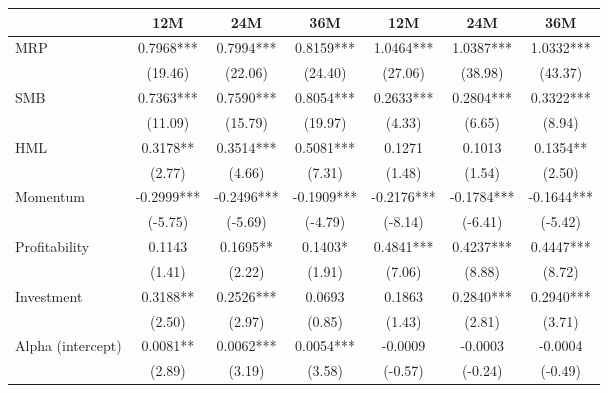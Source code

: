 \documentclass[xcolor=dvipsnames, english, 8pt]{beamer}
\begin{document}
\begin{frame}
\begin{footnotesize}
\begin{center}
\begin{tabular}{lcccccc}
              &\multicolumn{1}{c}{12M}&\multicolumn{1}{c}{24M}&\multicolumn{1}{c}{36M}&\multicolumn{1}{c}{12M}&\multicolumn{1}{c}{24M}&\multicolumn{1}{c}{36M}\\
\midrule
MRP &  0.7968***&  0.7994***&      0.8159***& 1.0464***&      1.0387***& 1.0332***\\
                    &     (19.46)         &     (22.06)         &     (24.40)         &     (27.06)         &     (38.98)         &     (43.37)         \\
\addlinespace
SMB  &  0.7363***&  0.7590***& 0.8054***&  0.2633***&      0.2804***&   0.3322***\\
                    &     (11.09)         &     (15.79)         &     (19.97)         &      (4.33)         &      (6.65)         &      (8.94)         \\
\addlinespace
HML & 0.3178** &  0.3514***& 0.5081***& 0.1271  &  0.1013 &  0.1354** \\
                    &      (2.77)         &      (4.66)         &      (7.31)         &      (1.48)         &      (1.54)         &      (2.50)         \\
\addlinespace
Momentum    & -0.2999***& -0.2496***& -0.1909***&-0.2176***&     -0.1784***&    -0.1644***\\
                    &     (-5.75)         &     (-5.69)         &     (-4.79)         &     (-8.14)         &     (-6.41)         &     (-5.42)         \\
\addlinespace
Profitability & 0.1143 &    0.1695** & 0.1403* & 0.4841***&      0.4237***& 0.4447***\\
                    &      (1.41)         &      (2.22)         &      (1.91)         &      (7.06)         &      (8.88)         &      (8.72)         \\
\addlinespace
Investment & 0.3188** & 0.2526***& 0.0693 & 0.1863 &0.2840***&      0.2940***\\
                    &      (2.50)         &      (2.97)         &      (0.85)         &      (1.43)         &      (2.81)         &      (3.71)         \\
\addlinespace
Alpha (intercept)  & 0.0081** & 0.0062***& 0.0054***&-0.0009    &     -0.0003         &     -0.0004         \\
                    &      (2.89)         &      (3.19)         &      (3.58)         &     (-0.57)         &     (-0.24)         &     (-0.49) \\
\bottomrule

\end{tabular}
\end{center}
\end{footnotesize}
\end{frame}
\end{document}
